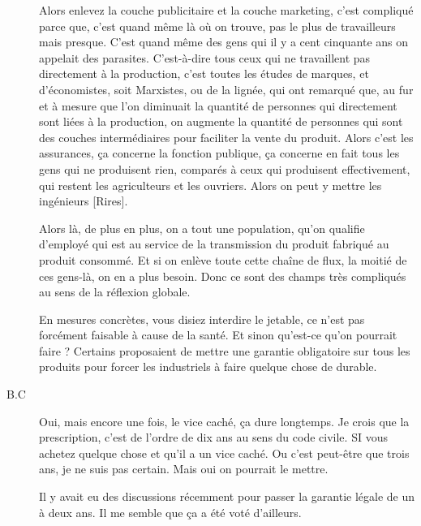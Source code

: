 \begin{description}
Alors enlevez la couche publicitaire et la couche marketing, c'est compliqué parce que, c'est quand même là où on trouve, pas le plus de travailleurs mais presque. C'est quand même des gens qui il y a cent cinquante ans on appelait des parasites. C'est-à-dire tous ceux qui ne travaillent pas directement à la production, c'est toutes les études de marques, et d'économistes, soit Marxistes, ou de la lignée, qui ont remarqué que, au fur et à mesure que l'on diminuait la quantité de personnes qui directement sont liées à la production, on augmente la quantité de personnes qui sont des couches intermédiaires pour faciliter la vente du produit. Alors c'est les assurances, ça concerne la fonction publique, ça concerne en fait tous les gens qui ne produisent rien, comparés à ceux qui produisent effectivement, qui restent les agriculteurs et les ouvriers. Alors on peut y mettre les ingénieurs [Rires].

Alors là, de plus en plus, on a tout une population, qu'on qualifie d'employé qui est au service de la transmission du produit fabriqué au produit consommé. Et si on enlève toute cette chaîne de flux, la moitié de ces gens-là, on en a plus besoin. Donc ce sont des champs très compliqués au sens de la réflexion globale. 

\vspace{1\baselineskip}

En mesures concrètes, vous disiez interdire le jetable, ce n'est pas forcément faisable à cause de la santé. Et sinon qu'est-ce qu'on pourrait faire ? Certains proposaient de mettre une garantie obligatoire sur tous les produits pour forcer les industriels à faire quelque chose de durable.

\vspace{1\baselineskip}

\item[B.C]Oui, mais encore une fois, le vice caché, ça dure longtemps. Je crois que la prescription, c'est de l'ordre de dix ans au sens du code civile. SI vous achetez quelque chose et qu'il a un vice caché. Ou c'est peut-être que trois ans, je ne suis pas certain. Mais oui on pourrait le mettre.

\vspace{1\baselineskip}

Il y avait eu des discussions récemment pour passer la garantie légale de un à deux ans. Il me semble que ça a été voté d'ailleurs.

\vspace{1\baselineskip}


\end{description}
